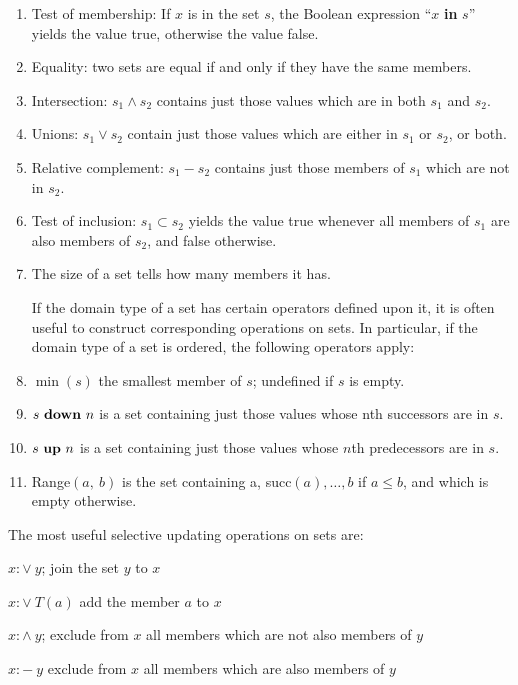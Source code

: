 \documentclass[twoside,11pt]{book}
\begin{document}
\begin{enumerate}[wide, nosep, label=(\arabic*)]
	\item Test of membership: If $x$ is in the set $s$, the Boolean expression ``$x$ \textbf{in} $s$'' yields the value true, otherwise the value false.
	\item Equality: two sets are equal if and only if they have the same members.
	\item Intersection: $s_1 \wedge s_2$ contains just those values which are in both $s_1$ and $s_2$.
	\item Unions: $s_1 \vee s_2$ contain just those values which are either in $s_1$ or $s_2$, or both.
	\item Relative complement: $s_1 - s_2$ contains just those members of $s_1$ which are not in $s_2$.
	\item Test of inclusion: $s_1 \subset s_2$ yields the value true whenever all members of $s_1$ are also members of $s_2$, and false otherwise.
	\item The size of a set tells how many members it has.

	If the domain type of a set has certain operators defined upon it, it is often useful to construct corresponding operations on sets. In particular, if the domain type of a set is ordered, the following operators apply:

	\item $\min(s)$ the smallest member of $s$; undefined if $s$ is empty.
	\item $s \text{ \textbf{down} } n$ is a set containing just those values whose nth successors are in $s$.
	\item $s \text{ \textbf{up} } n$ is a set containing just those values whose $n$th predecessors are in $s$.
	\item Range$(a,\ b)$ is the set containing a, succ$(a), \dots, b$ if $a \leqslant b$, and which is empty otherwise.
\end{enumerate}

The most useful selective updating operations on sets are:

\noindent
$x:\vee\ y$; \tabto*{5em} join the set $y$ to $x$

\noindent
$x:\vee\ T(a)$ \tabto*{5em} add the member $a$ to $x$

\noindent
$x:\wedge\ y$; \tabto*{5em} exclude from $x$ all members which are not also members of $y$

\noindent
$x:-\ y$ \tabto*{5em} exclude from $x$ all members which are also members of $y$
\end{document}

